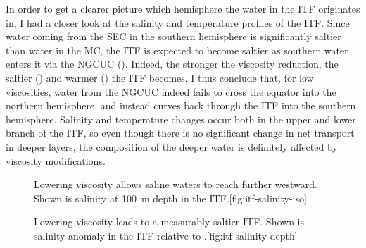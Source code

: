 In order to get a clearer picture which hemisphere the water in the \ac{ITF} originates in, I had a closer look at the salinity and temperature profiles of the \ac{ITF}. Since water coming from the \ac{SEC} in the southern hemisphere is significantly saltier than water in the \ac{MC}, the \ac{ITF} is expected to become saltier as southern water enters it via the \ac{NGCUC} (). Indeed, the stronger the viscosity reduction, the saltier () and warmer () the \ac{ITF} becomes. I thus conclude that, for low viscosities, water from the \ac{NGCUC} indeed fails to cross the equator into the northern hemisphere, and instead curves back through the \ac{ITF} into the southern hemisphere. Salinity and temperature changes occur both in the upper and lower branch of the \ac{ITF}, so even though there is no significant change in net transport in deeper layers, the composition of the deeper water is definitely affected by viscosity modifications.

\begin{figure}
	\begin{sidecaption}{Lowering viscosity allows saline waters to reach further westward. Shown is salinity at \SI{100}{\metre} depth in the \ac{ITF}.}[fig:itf-salinity-iso]
		\antimpjustification
	\end{sidecaption}
\end{figure}

\begin{figure}
	\begin{sidecaption}{Lowering viscosity leads to a measurably saltier \ac{ITF}. Shown is salinity anomaly in the \ac{ITF} relative to .}[fig:itf-salinity-depth]
		\antimpjustification
	\end{sidecaption}
\end{figure}

